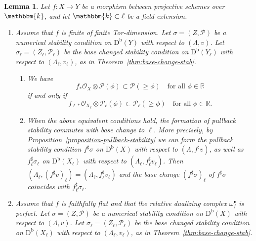 \documentclass[11pt, reqno]{amsart}
\numberwithin{equation}{section}
\theoremstyle{plain}
\newtheorem{lemma}[theorem]{Lemma}
\theoremstyle{remark}
\theoremstyle{definition}
\theoremstyle{italicsname}
\newcommand{\Db}{\mathrm{D^b}}
\newcommand{\cO}{\mathcal{O}}
\newcommand{\cP}{\mathscr{P}}
\newcommand{\KK}{\mathbbm{k}}
\def\RR{\ensuremath{\mathbb{R}}}
\begin{document}
\begin{lemma}\label{lem:base-change}
Let $f \colon X \to Y$ be a morphism between projective schemes over $\KK$, and let $\KK \subset \ell$ be a field extension.  
\begin{enumerate}[{\rm (1)}]
    \item\label{enum:BaseChange1} Assume that $f$ is finite of finite Tor-dimension. 
    Let $\sigma=(Z,\cP)$ be a numerical stability condition on $\Db(Y)$ with respect to $(\Lambda,v)$. 
    Let $\sigma_{\ell} = (Z_{\ell}, \cP_{\ell})$ be the base changed stability condition on $\Db(Y_{\ell})$ with respect to $(\Lambda_{\ell}, v_{\ell})$, as in Theorem~\ref{thm:base-change-stab}. 
    \begin{enumerate}[label={\rm(1.\alph*)}]
    \item \label{base-change-pullback-criterion} 
    We have 
    \begin{equation}
    \label{eq:push-f-k}
        f_* \cO_X \otimes \cP(\phi) \subset\cP(\geq\phi) \quad \text{for all } \phi \in \RR
    \end{equation}
    if and only if
    \begin{equation}\label{eq:push-l}
    f_{\ell*}\cO_{X_{\ell}} \otimes \cP_{\ell}(\phi) \subset 
    \cP_{\ell}(\geq \phi) \quad \text{for all } \phi \in \RR.
    \end{equation}
    \item \label{pullback-commute-w-bc}
    When the above equivalent conditions hold, the formation of pullback stability commutes with base change to $\ell$. 
    More precisely, by Proposition~\ref{proposition-pullback-stability} we can form the pullback stability condition $f^{\sharp}\sigma$ on $\Db(X)$ with respect to $(\Lambda, f^{\sharp}v)$, as well as $f_{\ell}^{\sharp} \sigma_{\ell}$ on $\Db(X_{\ell})$ with respect to $(\Lambda_{\ell}, f_{\ell}^{\sharp} v_{\ell})$. 
    Then $(\Lambda_{\ell}, (f^{\sharp}v)_{\ell}) = (\Lambda_{\ell}, f_{\ell}^{\sharp} v_{\ell})$ and the base change $(f^{\sharp}\sigma)_{\ell}$ of $f^{\sharp}\sigma$ coincides with  $f_{\ell}^{\sharp} \sigma_{\ell}$. 
    \end{enumerate} 
    \item\label{enum:BaseChange2} Assume that $f$ is faithfully flat and that the relative dualizing complex $\omega_f^{\bullet}$ is perfect. Let $\sigma=(Z,\cP)$ be a numerical stability condition on $\Db(X)$ with respect to $(\Lambda,v)$. 
    Let $\sigma_{\ell} = (Z_{\ell}, \cP_{\ell})$ be the base changed stability condition on $\Db(X_{\ell})$ with respect to $(\Lambda_{\ell}, v_{\ell})$, as in Theorem~\ref{thm:base-change-stab}. 

\end{enumerate}
\end{lemma}
\end{document}
